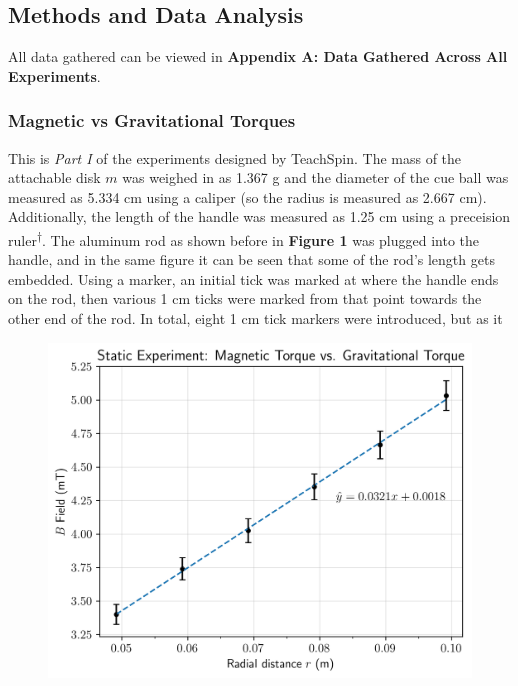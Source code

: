 \documentclass[12pt]{article}
\begin{document}
\begin{multicols}{2}
\subsection{Methods and Data Analysis}
All data gathered can be viewed in \textbf{Appendix A: Data Gathered Across All Experiments}.

\subsubsection{Magnetic vs Gravitational Torques}
This is \textit{Part I} of the experiments designed by TeachSpin.
The mass of the attachable disk $m$ was weighed in as 1.367 g and the diameter of the cue ball was
measured as 5.334 cm using a caliper (so the radius is measured as 2.667 cm).
Additionally, the length of the handle was measured as 1.25 cm using a preceision ruler\textsuperscript{$\dagger$}.
\renewcommand{\thefootnote}{$\dagger$}
The aluminum rod as shown before in \textbf{Figure 1} was plugged into the handle,
and in the same figure it can be seen that some of the rod's length gets embedded.
Using a marker, an initial tick was marked at where the handle ends on the rod,
then various 1 cm ticks were marked from that point towards the other end of the rod.
In total, eight 1 cm tick markers were introduced, but as it
\begin{figure}[H]
    \centering
    \includegraphics[width=0.98\linewidth]{figs/graph1.png}

\end{figure}
\end{multicols}
\end{document}
